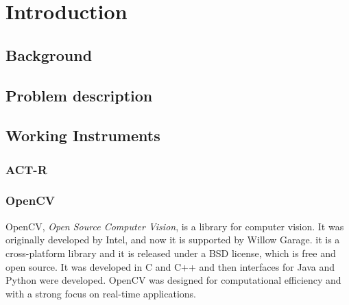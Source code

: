 \chapter{Introduction}
\section{Background}
\section{Problem description}
\section{Working Instruments}
\subsection{ACT-R}
\subsection{OpenCV}
	OpenCV, \emph{Open Source Computer Vision}, is a library for computer vision. It was originally developed by Intel, and now it is supported by Willow Garage.
	it is a cross-platform library and it is released under a BSD license, which is free and open source. It was developed in C and C++ and then interfaces for Java and Python were developed. OpenCV was designed for computational efficiency and with a strong focus on real-time applications.
